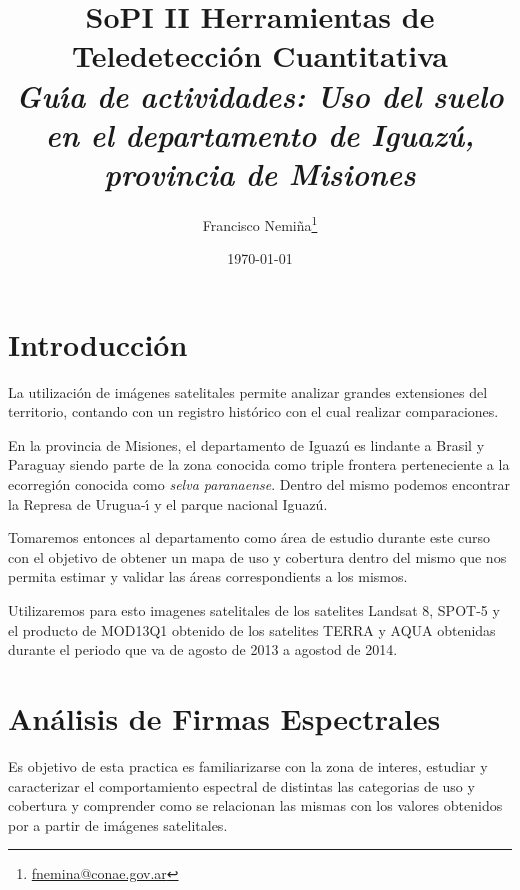 \documentclass[hidelinks,12pt]{article}
\title{SoPI II \- Herramientas de Teledetecci\'on Cuantitativa \\ 
\emph{Gu\'{\i}a de actividades: Uso del suelo en el departamento de Iguaz\'u,
provincia de Misiones}}
\author{Francisco
Nemi\~na\thanks{\href{mailto:fnemina@conae.govar}{fnemina@conae.gov.ar}}}
\affil{Unidad de Educaci\'on y Formaci\'on Masiva\\ 
    Comisi\'on Nacional de Actividades Espaciales}
\date{\today}
\begin{document}
\maketitle

\section*{Introducci\'on}

La utilización de imágenes satelitales permite analizar grandes extensiones del
territorio, contando con un registro histórico con el cual realizar
comparaciones.

En la provincia de Misiones, el departamento de Iguaz\'u es lindante a Brasil y 
Paraguay siendo parte de la zona conocida como triple frontera
perteneciente a la ecorregi\'on conocida como \emph{selva paranaense}. Dentro del 
mismo podemos encontrar la Represa de Urugua-\'{\i} y el parque nacional
Iguaz\'u.

Tomaremos entonces al departamento como \'area de estudio durante este curso
con el objetivo de obtener un mapa de uso y cobertura dentro del mismo que nos
permita estimar y validar  las \'areas correspondients a los mismos. 

Utilizaremos para esto imagenes satelitales de los satelites Landsat 8, SPOT-5 y
el producto de MOD13Q1 obtenido de los satelites TERRA y AQUA obtenidas durante el
periodo que va de agosto de 2013 a agostod de 2014. 

\newpage
\section{Análisis de Firmas Espectrales}
Es objetivo de esta practica es familiarizarse con la zona de interes, estudiar
y caracterizar el comportamiento espectral de distintas las categorias de uso y
cobertura y comprender como se relacionan las mismas con los valores obtenidos 
por a partir de im\'agenes  satelitales.
\end{document}
